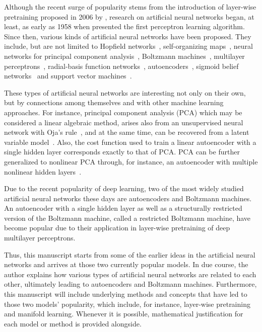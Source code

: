 \documentclass{now}
\begin{document}
Although the recent surge of popularity stems from the introduction of
layer-wise pretraining proposed in 2006 by
\citet{Hinton2006,Bengio2007nips,Ranzato2007}, research on artificial neural
networks began, at least, as early as 1958 when \citet{Rosenblatt1958} presented
the first perceptron learning algorithm. Since then, various kinds of artificial
neural networks have been proposed. They include, but are not limited to
Hopfield networks~\citep{Hopfield1982}, self-organizing
maps~\citep{Kohonen1982}, neural networks for principal component
analysis~\citep{Oja1982}, Boltzmann machines~\citep{Ackley1985}, multilayer
perceptrons~\citep{Rumelhart1986}, radial-basis function
networks~\citep{Broomhead1988}, autoencoders~\citep{Baldi1989}, sigmoid belief
networks~\citep{Neal1992} and support vector machines~\citep{Cortes1995}.

These types of artificial neural networks are interesting not only on their
own, but by connections among themselves and with other machine learning
approaches. For instance, principal component analysis
(PCA) which may be considered a
linear algebraic method, arises also from an unsupervised neural network with
Oja's rule~\citep{Oja1982}, and at the same time, can be recovered from a
latent variable model~\citep{Tipping1999,Roweis1998}.  Also, the cost function
used to train a linear autoencoder with a single hidden layer corresponds
exactly to that of PCA.  PCA can be further generalized to nonlinear PCA
through, for instance, an autoencoder with multiple nonlinear hidden
layers~\citep{Kramer1991,Oja1991}. 

Due to the recent popularity of deep learning, two of the most widely studied
artificial neural networks these days are autoencoders and Boltzmann machines.
An autoencoder with a single hidden layer as well as a structurally restricted
version of the Boltzmann machine, called a restricted Boltzmann machine, have
become popular due to their application in layer-wise pretraining of deep
multilayer perceptrons. 

Thus, this manuscript starts from some of the earlier ideas in the artificial
neural networks and arrives at those two currently popular models. In due
course, the author explains how various types of artificial neural networks are
related to each other, ultimately leading to autoencoders and Boltzmann
machines. Furthermore, this manuscript will include underlying methods and
concepts that have led to those two models' popularity, which include, for
instance, layer-wise pretraining and manifold learning.  Whenever it is
possible, mathematical justification for each model or method is provided
alongside.
\end{document}

